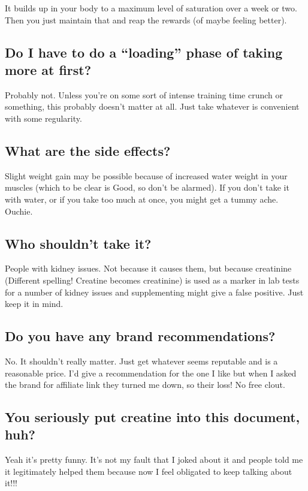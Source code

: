 \documentclass{article}
\begin{document}
{{It builds up in your body to a maximum level of saturation over a week or two. Then you just maintain that and reap the rewards (of maybe feeling better).

\subsection{Do I have to do a “loading” phase of taking more at first?}

Probably not. Unless you’re on some sort of intense training time crunch or something, this probably doesn’t matter at all. Just take whatever is convenient with some regularity.

\subsection{What are the side effects?}

Slight weight gain may be possible because of increased water weight in your muscles (which to be clear is Good, so don't be alarmed). If you don’t take it with water, or if you take too much at once, you might get a tummy ache. Ouchie.

\subsection{Who shouldn’t take it?}

People with kidney issues. Not because it causes them, but because creatinine (Different spelling! Creatine becomes creatinine) is used as a marker in lab tests for a number of kidney issues and supplementing might give a false positive. Just keep it in mind.

\subsection{Do you have any brand recommendations?}

No. It shouldn’t really matter. Just get whatever seems reputable and is a reasonable price. I’d give a recommendation for the one I like but when I asked the brand for affiliate link they turned me down, so their loss! No free clout.

\subsection{You seriously put creatine into this document, huh?}

Yeah it’s pretty funny. It’s not my fault that I joked about it and people told me it legitimately helped them because now I feel obligated to keep talking about it!!!

}}
\end{document}
